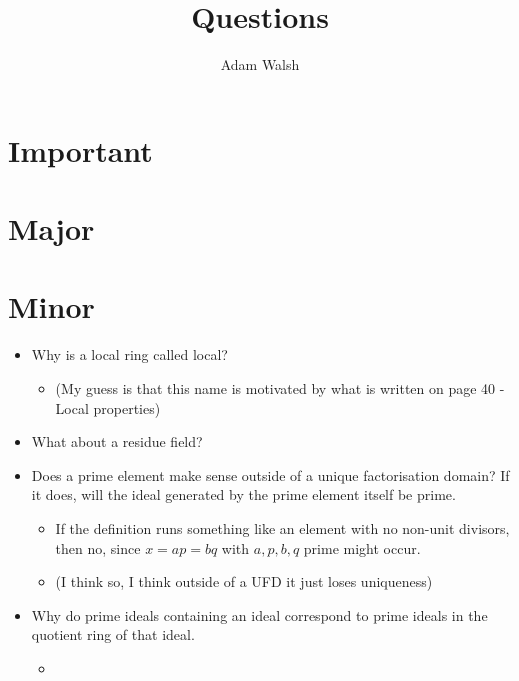 \documentclass[a4paper]{amsart}
\title{Questions}
\author{Adam Walsh}
\begin{document}
\maketitle

\section{Important}
\section{Major}
\section{Minor}
\begin{itemize}
    \item Why is a local ring called local? 
        \begin{itemize}
            \item (My guess is that this name is motivated by what is written on page 40 - Local properties)
        \end{itemize}
    \item What about a residue field?
    \item Does a prime element make sense outside of a unique factorisation domain? If it does, will the ideal generated by the prime element itself be prime.  
    \begin{itemize}
        \item If the definition runs something like an element with no non-unit divisors, then no, since $x=ap=bq$ with $a,p,b,q$ prime might occur.
        \item (I think so, I think outside of a UFD it just loses uniqueness)
    \end{itemize}
    \item Why do prime ideals containing an ideal correspond to prime ideals in the quotient ring of that ideal. 
    \begin{itemize}
        \item 

\end{itemize}
\end{itemize}
\end{document}

